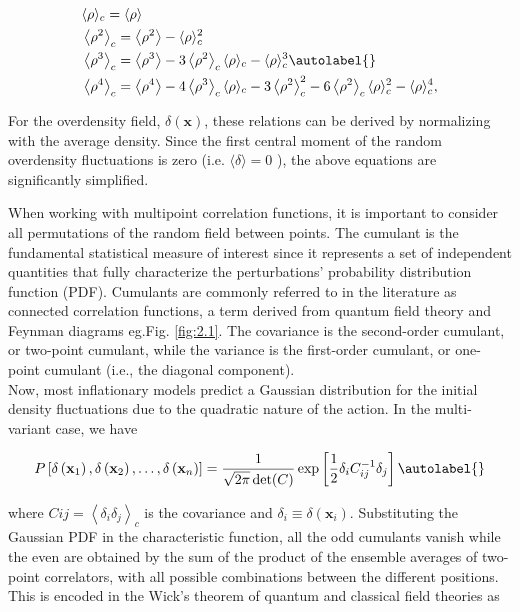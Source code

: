 \begin{align}
    & \langle\rho\rangle_{c}=\langle\rho\rangle \\
    & \left\langle\rho^{2}\right\rangle_{c}=\left\langle\rho^{2}\right\rangle-\langle\rho\rangle_{c}^{2} \\
    & \left\langle\rho^{3}\right\rangle_{c}=\left\langle\rho^{3}\right\rangle-3\left\langle\rho^{2}\right\rangle_{c}\langle\rho\rangle_{c}-\langle\rho\rangle_{c}^{3}  \autolabel{}\\
    & \left\langle\rho^{4}\right\rangle_{c}=\left\langle\rho^{4}\right\rangle-4\left\langle\rho^{3}\right\rangle_{c}\langle\rho\rangle_{c}-3\left\langle\rho^{2}\right\rangle_{c}^{2}-6\left\langle\rho^{2}\right\rangle_{c}\langle\rho\rangle_{c}^{2}-\langle\rho\rangle_{c}^{4},
\end{align}


For the overdensity field,  $\delta(\mathbf{x})$, these relations can be derived by normalizing with the average density. Since the first central moment of the random overdensity fluctuations is zero (i.e. $\langle\delta\rangle=0$ ), the above equations are significantly simplified.

 When working with multipoint correlation functions, it is important to consider all permutations of the random field between points. The cumulant is the fundamental statistical measure of interest since it represents a set of independent quantities that fully characterize the perturbations' probability distribution function (PDF). Cumulants are commonly referred to in the literature as connected correlation functions, a term derived from quantum field theory and Feynman diagrams eg.Fig. \ref{fig:2.1}. The covariance is the second-order cumulant, or two-point cumulant, while the variance is the first-order cumulant, or one-point cumulant (i.e., the diagonal component).\\

Now, most inflationary models predict a Gaussian distribution for the initial density fluctuations due to the quadratic nature of the action. In the multi-variant case, we have


\begin{equation}
    P\left[\delta\left(\mathbf{x}_{1}\right), \delta\left(\mathbf{x}_{2}\right), \ldots, \delta\left(\mathbf{x}_{n}\right)\right]=\frac{1}{\sqrt{2 \pi} \operatorname{det}(C)} \exp \left[\frac{1}{2} \delta_{i} C_{i j}^{-1} \delta_{j}\right] \autolabel{}
\end{equation}


where $C i j=\left\langle\delta_{i} \delta_{j}\right\rangle_{c}$ is the covariance and $\delta_{i} \equiv \delta\left(\mathbf{x}_{i}\right)$. Substituting the Gaussian PDF in the characteristic function, all the odd cumulants vanish while the even are obtained by the sum of the product of the ensemble averages of two-point correlators, with all possible combinations between the different positions. This is encoded in the Wick's theorem of quantum and classical field theories as


